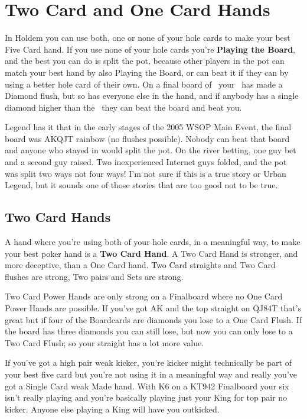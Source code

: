 \chapter{Two Card and One Card Hands}


In Holdem you can use both, one or none of your hole cards to make your
best Five Card hand. If you use none of your hole cards you're
\textbf{Playing the Board}, and the best you can do is split the
pot, because other players in the pot can match your best hand by also
Playing the Board, or can beat it if they can by using a better hole
card of their own. On a final board of \Ad\nined\eigd\Jd\sixd\ your
\Qc\Qs\ has made a Diamond flush, but so has everyone else in the hand,
and if anybody has a single diamond higher than the \sixd\ they can
beat the board and beat you.

Legend has it that in the early stages of the 2005 WSOP Main Event,
the final board was AKQJT rainbow (no flushes possible). Nobody can
beat that board and anyone who stayed in would split the pot. On the
river betting, one guy bet and a second guy raised. Two inexperienced
Internet guys folded, and the pot was split two ways not four ways!
I'm not sure if this is a true story or Urban Legend, but it sounds
one of those stories that are too good not to be true.

\section{Two Card Hands}

A hand where you're using both of your hole cards, in a meaningful
way, to make your best poker hand is a \textbf{Two Card
Hand}. A Two Card Hand is stronger, and more deceptive, than a
One Card hand. Two Card straights and Two Card flushes are
strong, Two pairs and Sets are strong.

Two Card Power Hands are only strong on a Finalboard where no
One Card Power Hands are possible. If you've got AK and the top
straight on QJ84T that's great but if four of the Boardcards are
diamonds you lose to a One Card Flush. If the board has three
diamonds you can still lose, but now you can only lose to a Two
Card Flush; so your straight has a lot more value.

If you've got a high pair weak kicker, you're kicker might technically
be part of your best five card but you're not using it in a meaningful
way and really you've got a Single Card weak Made hand. With K6 on a
KT942 Finalboard your six isn't really playing and you're
basically playing just your King for top pair no kicker. Anyone else
playing a King will have you outkicked.

